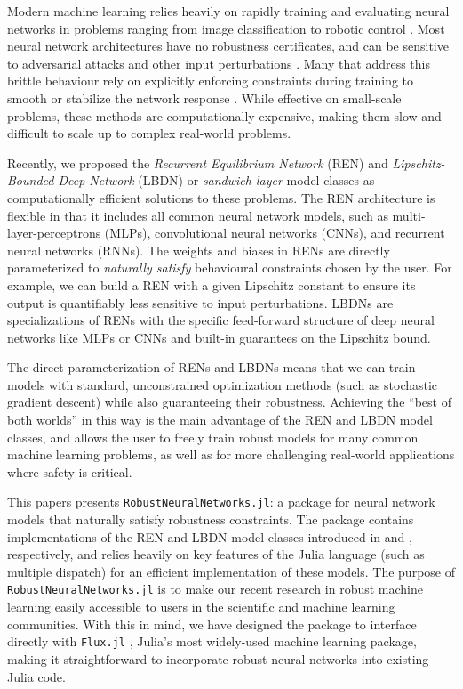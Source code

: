Modern machine learning relies heavily on rapidly training and evaluating neural networks in problems ranging from image classification \cite{He++2016} to robotic control \cite{Siekmann++2021a}. Most neural network architectures have no robustness certificates, and can be sensitive to adversarial attacks and other input perturbations \cite{Huang++2017}. Many that address this brittle behaviour rely on explicitly enforcing constraints during training to smooth or stabilize the network response \cite{Pauli++2022,Junnarkar++2023}. While effective on small-scale problems, these methods are computationally expensive, making them slow and difficult to scale up to complex real-world problems.

Recently, we proposed the \textit{Recurrent Equilibrium Network} (REN) \cite{Revay++2021b} and \textit{Lipschitz-Bounded Deep Network} (LBDN) or \textit{sandwich layer} \cite{Wang+Manchester2023} model classes as computationally efficient solutions to these problems. The REN architecture is flexible in that it includes all common neural network models, such as multi-layer-perceptrons (MLPs), convolutional neural networks (CNNs), and recurrent neural networks (RNNs). The weights and biases in RENs are directly parameterized to \textit{naturally satisfy} behavioural constraints chosen by the user. For example, we can build a REN with a given Lipschitz constant to ensure its output is quantifiably less sensitive to input perturbations. LBDNs are specializations of RENs with the specific feed-forward structure of deep neural networks like MLPs or CNNs and built-in guarantees on the Lipschitz bound.

The direct parameterization of RENs and LBDNs means that we can train models with standard, unconstrained optimization methods (such as stochastic gradient descent) while also guaranteeing their robustness. Achieving the “best of both worlds” in this way is the main advantage of the REN and LBDN model classes, and allows the user to freely train robust models for many common machine learning problems, as well as for more challenging real-world applications where safety is critical.

This papers presents \verb|RobustNeuralNetworks.jl|: a package for neural network models that naturally satisfy robustness constraints. The package contains implementations of the REN and LBDN model classes introduced in \cite{Revay++2021b} and \cite{Wang+Manchester2023}, respectively, and relies heavily on key features of the Julia language \cite{Bezanson++2017} (such as multiple dispatch) for an efficient implementation of these models. The purpose of \verb|RobustNeuralNetworks.jl| is to make our recent research in robust machine learning easily accessible to users in the scientific and machine learning communities. With this in mind, we have designed the package to interface directly with \verb|Flux.jl| \cite{Innes2018}, Julia's most widely-used machine learning package, making it straightforward to incorporate robust neural networks into existing Julia code.

